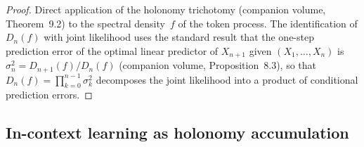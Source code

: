 \documentclass[11pt,a4paper]{article}
\theoremstyle{definition}
\theoremstyle{remark}
\begin{document}
\begin{proof}
Direct application of the holonomy trichotomy
(companion volume, Theorem~9.2) to the spectral
density~$f$ of the token process.
The identification of $D_n(f)$ with joint likelihood uses the
standard result that the one-step prediction error of the
optimal linear predictor of $X_{n+1}$ given
$(X_1, \ldots, X_n)$ is
$\sigma_n^2 = D_{n+1}(f)/D_n(f)$
(companion volume, Proposition~8.3), so that
$D_n(f) = \prod_{k=0}^{n-1} \sigma_k^2$ decomposes the joint
likelihood into a product of conditional prediction errors.
\end{proof}

\subsection*{In-context learning as holonomy accumulation}
\end{document}
